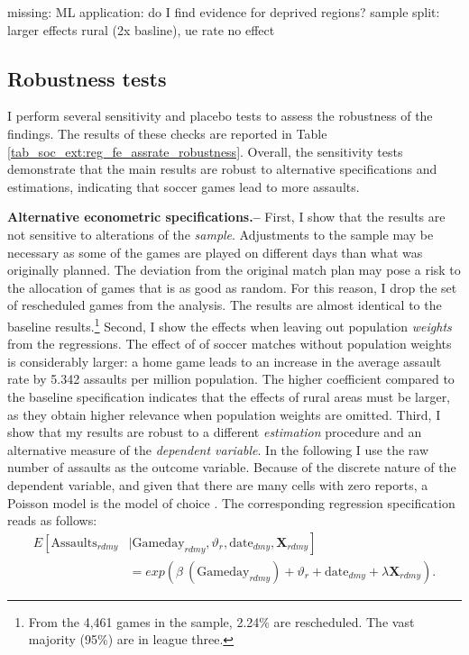 \documentclass[11pt, a4paper]{article} %
\begin{document}
{\color{red} missing: ML application: do I find evidence for deprived regions?}\newline
sample split: larger effects rural (2x basline), ue rate no effect 










\subsection{Robustness tests}
I perform several sensitivity and placebo tests to assess the robustness of the findings. The results of these checks are reported in Table \ref{tab_soc_ext:reg_fe_assrate_robustness}. Overall, the sensitivity tests demonstrate that the main results are robust to alternative specifications and estimations, indicating that soccer games lead to more assaults.\newline


\textbf{Alternative econometric specifications.--} First, I show that the results are not sensitive to alterations of the \textit{sample}. Adjustments to the sample may be necessary as some of the games are played on different days than what was originally planned. The deviation from the original match plan may pose a risk to the allocation of games that is as good as random. For this reason, I drop the set of rescheduled games from the analysis. The results are almost identical to the baseline results.\footnote{From the 4,461 games in the sample, 2.24\% are rescheduled. The vast majority (95\%) are in league three.} Second, I show the effects when leaving out population \textit{weights} from the regressions. The effect of of soccer matches without population weights is considerably larger: a home game leads to an increase in the average assault rate by 5.342 assaults per million population. The higher coefficient compared to the baseline specification indicates that the effects of rural areas must be larger, as they obtain higher relevance when population weights are omitted. Third, I show that my results are robust to a different \textit{estimation} procedure and an alternative measure of the \textit{dependent variable}. In the following I use the raw number of assaults as the outcome variable. Because of the discrete nature of the dependent variable, and given that there are many cells with zero reports, a Poisson model is the model of choice \citep{lindo2018college}. The corresponding regression specification reads as follows:
\begin{align}
E\left[ \text{Assaults}_{rdmy}\right.&|\left.\text{Gameday}_{rdmy},\vartheta_r,\text{date}_{dmy}, \mathbf{X}_{rdmy}  \right] \nonumber \\ &=  exp\left( \beta\ (\text{Gameday}_{rdmy}) + \vartheta_r + \text{date}_{dmy} + \lambda\mathbf{X}_{rdmy} \right). 
\label{eq_soc_ext:poisson_model}
\end{align}
\end{document}
